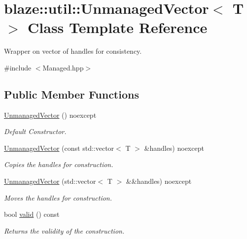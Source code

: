 \hypertarget{classblaze_1_1util_1_1UnmanagedVector}{}\section{blaze\+:\+:util\+:\+:Unmanaged\+Vector$<$ T $>$ Class Template Reference}
\label{classblaze_1_1util_1_1UnmanagedVector}


Wrapper on vector of handles for consistency.  




{\ttfamily \#include $<$Managed.\+hpp$>$}

\subsection*{Public Member Functions}
\begin{DoxyCompactItemize}
\item 
\mbox{\label{classblaze_1_1util_1_1UnmanagedVector_ae2e722d08c5247bceff137c73e7447d6}} 
\hyperlink{classblaze_1_1util_1_1UnmanagedVector_ae2e722d08c5247bceff137c73e7447d6}{Unmanaged\+Vector} () noexcept
\begin{DoxyCompactList}\small\item\em Default Constructor. \end{DoxyCompactList}\item 
\mbox{\label{classblaze_1_1util_1_1UnmanagedVector_a3a2030e5b1f1e1b3fd7d083d2d17d798}} 
\hyperlink{classblaze_1_1util_1_1UnmanagedVector_a3a2030e5b1f1e1b3fd7d083d2d17d798}{Unmanaged\+Vector} (const std\+::vector$<$ T $>$ \&handles) noexcept
\begin{DoxyCompactList}\small\item\em Copies the handles for construction. \end{DoxyCompactList}\item 
\mbox{\label{classblaze_1_1util_1_1UnmanagedVector_a13a25be3b436be664beb83b13c3f1378}} 
\hyperlink{classblaze_1_1util_1_1UnmanagedVector_a13a25be3b436be664beb83b13c3f1378}{Unmanaged\+Vector} (std\+::vector$<$ T $>$ \&\&handles) noexcept
\begin{DoxyCompactList}\small\item\em Moves the handles for construction. \end{DoxyCompactList}\item 
bool \hyperlink{classblaze_1_1util_1_1UnmanagedVector_a13e031e44e8ddfa77492bedbf1c82780}{valid} () const
\begin{DoxyCompactList}\small\item\em Returns the validity of the construction. \end{DoxyCompactList}\end{DoxyCompactItemize}
